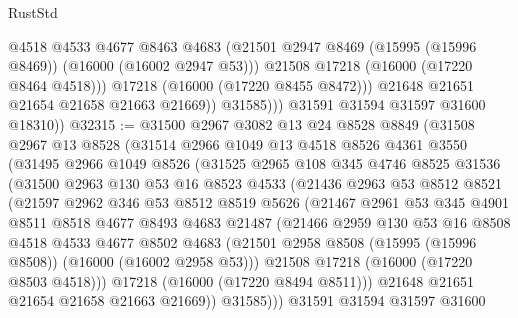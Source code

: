 \begin{lexlean}{RustStd}
\begin{coremodule}
                      @4518
                      @4533
                      @4677
                      @8463
                      @4683
                      (@21501 @2947 @8469 (@15995 (@15996 @8469)) (@16000 (@16002 @2947 @53)))
                      @21508
                      @17218
                      (@16000 (@17220 @8464 @4518)))
                    @17218
                    (@16000 (@17220 @8455 @8472)))
                  @21648
                  @21651
                  @21654
                  @21658
                  @21663
                  @21669))
              @31585)))
        @31591
        @31594
        @31597
        @31600
        @18310))
@32315 := @31500
    @2967
    @3082
    @13
    @24
    @8528
    @8849
    (@31508
      @2967
      @13
      @8528
      (@31514
        @2966
        @1049
        @13
        @4518
        @8526
        @4361
        @3550
        (@31495
          @2966
          @1049
          @8526
          (@31525
            @2965
            @108
            @345
            @4746
            @8525
            @31536
            (@31500
              @2963
              @130
              @53
              @16
              @8523
              @4533
              (@21436
                @2963
                @53
                @8512
                @8521
                (@21597
                  @2962
                  @346
                  @53
                  @8512
                  @8519
                  @5626
                  (@21467
                    @2961
                    @53
                    @345
                    @4901
                    @8511
                    @8518
                    @4677
                    @8493
                    @4683
                    @21487
                    (@21466
                      @2959
                      @130
                      @53
                      @16
                      @8508
                      @4518
                      @4533
                      @4677
                      @8502
                      @4683
                      (@21501 @2958 @8508 (@15995 (@15996 @8508)) (@16000 (@16002 @2958 @53)))
                      @21508
                      @17218
                      (@16000 (@17220 @8503 @4518)))
                    @17218
                    (@16000 (@17220 @8494 @8511)))
                  @21648
                  @21651
                  @21654
                  @21658
                  @21663
                  @21669))
              @31585)))
        @31591
        @31594
        @31597
        @31600

\end{coremodule}
\end{lexlean}
